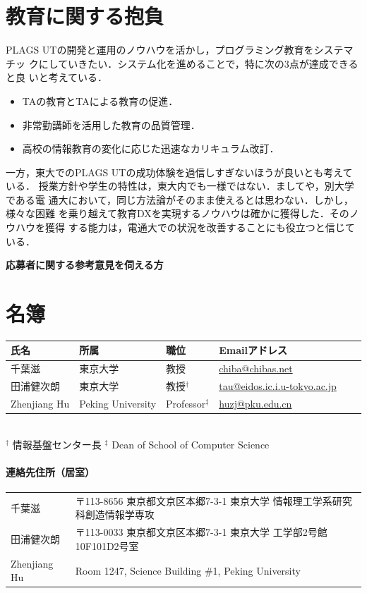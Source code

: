 \documentclass[dvipdfmx]{jsarticle}
\begin{document}
\section*{教育に関する抱負}

PLAGS UTの開発と運用のノウハウを活かし，プログラミング教育をシステマチッ
クにしていきたい．システム化を進めることで，特に次の3点が達成できると良
いと考えている．
\begin{itemize}
 \item TAの教育とTAによる教育の促進．

 \item 非常勤講師を活用した教育の品質管理．

 \item 高校の情報教育の変化に応じた迅速なカリキュラム改訂．
\end{itemize}

一方，東大でのPLAGS UTの成功体験を過信しすぎないほうが良いとも考えている．
授業方針や学生の特性は，東大内でも一様ではない．ましてや，別大学である電
通大において，同じ方法論がそのまま使えるとは思わない．しかし，様々な困難
を乗り越えて教育DXを実現するノウハウは確かに獲得した．そのノウハウを獲得
する能力は，電通大での状況を改善することにも役立つと信じている．

\newpage
\begin{center}
\LARGE\bfseries 応募者に関する参考意見を伺える方
\end{center}
\bigskip

\section*{名簿}
\begin{center}
\begin{tabular}[t]{llllll}
氏名 & 所属 & 職位 & Emailアドレス \\ \hline
千葉滋 & 東京大学 & 教授 & \url{chiba@chibas.net}  \\
田浦健次朗 & 東京大学 & 教授$^\dagger$ & \url{tau@eidos.ic.i.u-tokyo.ac.jp} \\
Zhenjiang Hu & Peking University & Professor$^\ddagger$ & \url{huzj@pku.edu.cn} \\
\end{tabular}
\medskip\\
\noindent
$^\dagger$ 情報基盤センター長
\qquad
\noindent
$^\ddagger$ Dean of School of Computer Science
\end{center}
\paragraph{連絡先住所（居室）}
\begin{center}
\begin{tabular}[t]{ll}
千葉滋 & 〒113-8656 東京都文京区本郷7-3-1 東京大学 情報理工学系研究科創造情報学専攻 \\
田浦健次朗 & 〒113-0033 東京都文京区本郷7-3-1 東京大学 工学部2号館10F101D2号室 \\
Zhenjiang Hu & Room 1247, Science Building \#1, Peking University \\
\end{tabular}
\end{center}
\end{document}
